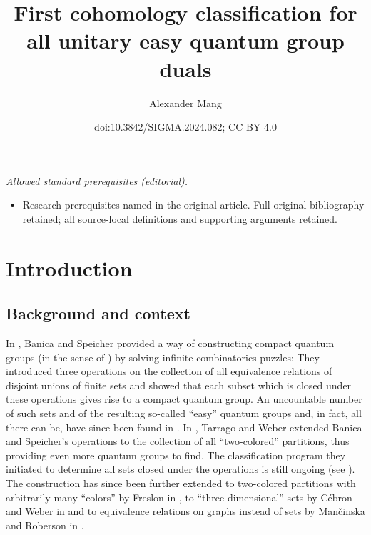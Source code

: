 \documentclass[10pt,a4paper]{amsart}
\title{First cohomology classification for all unitary easy quantum group duals}
\author{Alexander Mang}
\date{doi:10.3842/SIGMA.2024.082; CC BY 4.0}
\numberwithin{equation}{section}
\begin{document}
\maketitle
\noindent\textit{Allowed standard prerequisites (editorial).}\begin{itemize}
\item Research prerequisites named in the original article. Full original bibliography retained; all source-local definitions and supporting arguments retained.
\end{itemize}\medskip
\section{Introduction}
\label{section:introduction}

\subsection{Background and context}
\label{section:introduction-background-and-context}
In \cite{BanicaSpeicher2009}, Banica and Speicher provided a way of constructing compact quantum groups (in the sense of \cite{Woronowicz1987b, Woronowicz1991, Woronowicz1998}) by solving infinite combinatorics puzzles:  They introduced three operations on the collection of all equivalence relations of disjoint unions of finite sets and showed that each subset which is closed under these operations gives rise to a compact quantum group. An uncountable number of such sets and of the resulting so-called ``easy''  quantum groups and, in fact, all there can be, have since been found in \cite{BanicaCurranSpeicher2010,BanicaSpeicher2009, RaumWeber2014, RaumWeber2016a, RaumWeber2016b, Weber2013}. In \cite{TarragoWeber2018}, Tarrago and Weber extended Banica and Speicher's operations to the collection of all ``two-co\-lo\-red'' partitions, thus providing even more quantum groups to find. The classification program they initiated to determine all sets closed under the operations is still ongoing (see \cite{ Gromada2018,Maassen2021, Mang2022, MangWeber2020, MangWeber2021a, MangWeber2021b, MangWeber2021c, TarragoWeber2018}). The construction has since been further extended to two-co\-lo\-red partitions with arbitrarily many ``colors'' by Freslon in \cite{Freslon2017}, to ``three-dimensional'' sets  by C\'ebron and Weber in \cite{CebronWeber2016} and to  equivalence relations on graphs instead of sets by Man\v{c}inska and Roberson in \cite{MancinskaRoberson2020}.
\end{document}

